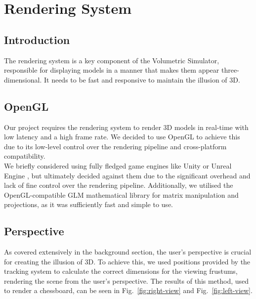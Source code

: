 \section{Rendering System}
\subsection{Introduction}
The rendering system is a key component of the Volumetric Simulator, responsible for displaying models in a manner that makes them appear three-dimensional. It needs to be fast and responsive to maintain the illusion of 3D.

\subsection{OpenGL}

Our project requires the rendering system to render 3D models in real-time with low latency and a high frame rate. We decided to use OpenGL \cite{woo1999opengl} to achieve this due to its low-level control over the rendering pipeline and cross-platform compatibility. \\

We briefly considered using fully fledged game engines like Unity \cite{noauthor_unity_nodate} or Unreal Engine \cite{unrealengine}, but ultimately decided against them due to the significant overhead and lack of fine control over the rendering pipeline. Additionally, we utilised the OpenGL-compatible GLM \cite{noauthor_g-trucglm_2024} mathematical library for matrix manipulation and projections, as it was sufficiently fast and simple to use.

\subsection{Perspective}

As covered extensively in the background section, the user’s perspective is crucial for creating the illusion of 3D. To achieve this, we used positions provided by the tracking system to calculate the correct dimensions for the viewing frustums, rendering the scene from the user’s perspective. The results of this method, used to render a chessboard, can be seen in Fig.~\ref{fig:right-view} and Fig.~\ref{fig:left-view}.

